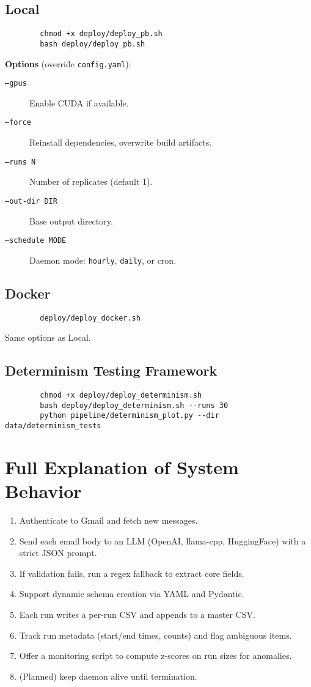 \documentclass{article}
\begin{document}
	\subsection{Local}
	\begin{verbatim}
		chmod +x deploy/deploy_pb.sh
		bash deploy/deploy_pb.sh
	\end{verbatim}
	\textbf{Options} (override \texttt{config.yaml}):
	\begin{description}
		\item[\texttt{--gpus}] Enable CUDA if available.
		\item[\texttt{--force}] Reinstall dependencies, overwrite build artifacts.
		\item[\texttt{--runs N}] Number of replicates (default 1).
		\item[\texttt{--out-dir DIR}] Base output directory.
		\item[\texttt{--schedule MODE}] Daemon mode: \texttt{hourly}, \texttt{daily}, or cron.
	\end{description}
	
	\subsection{Docker}
	\begin{verbatim}
		deploy/deploy_docker.sh
	\end{verbatim}
	Same options as Local.
	
	\subsection{Determinism Testing Framework}
	\begin{verbatim}
		chmod +x deploy/deploy_determinism.sh
		bash deploy/deploy_determinism.sh --runs 30
		python pipeline/determinism_plot.py --dir data/determinism_tests
	\end{verbatim}
	
	\section{Full Explanation of System Behavior}
	\begin{enumerate}
		\item Authenticate to Gmail and fetch new messages.
		\item Send each email body to an LLM (OpenAI, llama-cpp, HuggingFace) with a strict JSON prompt.
		\item If validation fails, run a regex fallback to extract core fields.
		\item Support dynamic schema creation via YAML and Pydantic.
		\item Each run writes a per-run CSV and appends to a master CSV.
		\item Track run metadata (start/end times, counts) and flag ambiguous items.
		\item Offer a monitoring script to compute z-scores on run sizes for anomalies.
		\item (Planned) keep daemon alive until termination.  
	\end{enumerate}
	
\end{document}
